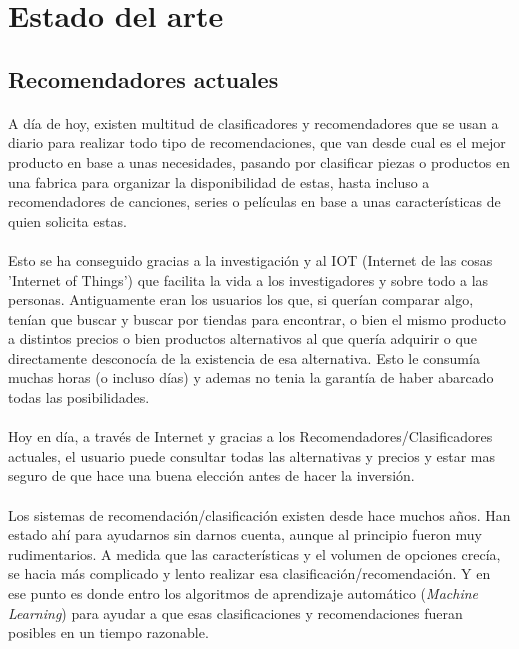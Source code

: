 \section{Estado del arte}
\label{chapter:estado_del_arte}

\subsection{Recomendadores actuales}

\paragraph{}
A día de hoy, existen multitud de clasificadores y recomendadores\cite{ref:sorter_art_1} que se usan a diario para realizar todo tipo de recomendaciones, que van desde cual es el mejor producto en base a unas necesidades, pasando por clasificar piezas o productos en una fabrica para organizar la disponibilidad de estas, hasta incluso a recomendadores de canciones, series o películas en base a unas características de quien solicita estas.

\paragraph{}
Esto se ha conseguido gracias a la investigación y al IOT (Internet de las cosas 'Internet of Things') que facilita la vida a los investigadores y sobre todo a las personas. Antiguamente eran los usuarios los que, si querían comparar algo, tenían que buscar y buscar por tiendas para encontrar, o bien el mismo producto a distintos precios o bien productos alternativos al que quería adquirir o que directamente desconocía de la existencia de esa alternativa. Esto le consumía muchas horas (o incluso días) y ademas no tenia la garantía de haber abarcado todas las posibilidades\cite{ref:traditional_purchase_internet_purchase}.

\paragraph{}
Hoy en día, a través de Internet y gracias a los Recomendadores/Clasificadores actuales, el usuario puede consultar todas las alternativas y precios y estar mas seguro de que hace una buena elección antes de hacer la inversión\cite{ref:internet_comparatives}.

\paragraph{}
Los sistemas de recomendación/clasificación existen desde hace muchos años\cite{ref:history_recommender}. Han estado ahí para ayudarnos sin darnos cuenta, aunque al principio fueron muy rudimentarios. A medida que las características y el volumen de opciones crecía, se hacia más complicado y lento realizar esa clasificación/recomendación. Y en ese punto es donde entro los algoritmos de aprendizaje automático (\textit{Machine Learning}) para ayudar a que esas clasificaciones y recomendaciones fueran posibles en un tiempo razonable.

